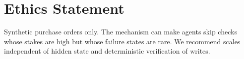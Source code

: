 \documentclass[11pt]{article}
\begin{document}
\section*{Ethics Statement}
Synthetic purchase orders only. The mechanism can make agents skip checks whose stakes are high but whose failure
states are rare. We recommend scales independent of hidden state and deterministic verification of writes.




\appendix

\end{document}
